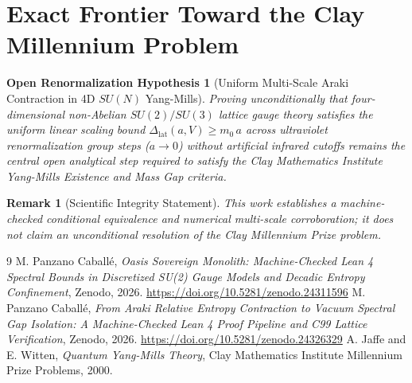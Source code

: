 \documentclass[11pt,a4paper]{article}
\newtheorem{conjecture}{Open Renormalization Hypothesis}
\newtheorem{remark}{Remark}
\begin{document}
\section{Exact Frontier Toward the Clay Millennium Problem}
\begin{conjecture}[Uniform Multi-Scale Araki Contraction in 4D $SU(N)$ Yang-Mills]
Proving unconditionally that four-dimensional non-Abelian $SU(2)/SU(3)$ lattice gauge theory satisfies the uniform linear scaling bound $\Delta_{\mathrm{lat}}(a, V) \ge m_0 \, a$ across ultraviolet renormalization group steps ($a \to 0$) without artificial infrared cutoffs remains the central open analytical step required to satisfy the Clay Mathematics Institute Yang-Mills Existence and Mass Gap criteria.
\end{conjecture}

\begin{remark}[Scientific Integrity Statement]
This work establishes a machine-checked conditional equivalence and numerical multi-scale corroboration; it does not claim an unconditional resolution of the Clay Millennium Prize problem.
\end{remark}

\begin{thebibliography}{9}
 M. Panzano Caball\'e, \emph{Oasis Sovereign Monolith: Machine-Checked Lean 4 Spectral Bounds in Discretized SU(2) Gauge Models and Decadic Entropy Confinement}, Zenodo, 2026. \url{https://doi.org/10.5281/zenodo.24311596}
 M. Panzano Caball\'e, \emph{From Araki Relative Entropy Contraction to Vacuum Spectral Gap Isolation: A Machine-Checked Lean 4 Proof Pipeline and C99 Lattice Verification}, Zenodo, 2026. \url{https://doi.org/10.5281/zenodo.24326329}
 A. Jaffe and E. Witten, \emph{Quantum Yang-Mills Theory}, Clay Mathematics Institute Millennium Prize Problems, 2000.
\end{thebibliography}
\end{document}

